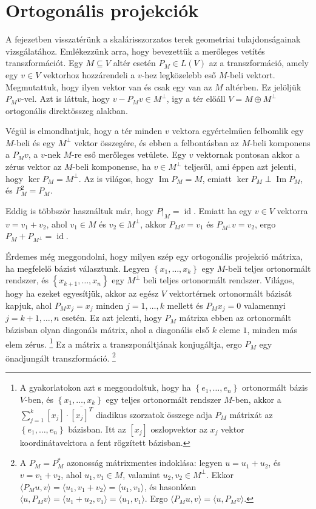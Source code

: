 \documentclass[9pt, a4paper, showtrims]{memoir}
\theoremstyle{plain}
\theoremstyle{remark}
\theoremstyle{definition}
\DeclareMathOperator{\id}{id}
\DeclareMathOperator{\im}{Im}
\newcommand{\ip}[2]{\langle#1,#2\rangle}
\begin{document}
\chapter{Ortogonális projekciók}
A fejezetben visszatérünk a skalárisszorzatos terek geometriai tulajdonságainak vizsgálatához.
Emlékezzünk arra, hogy bevezettük a merőleges vetítés transzformációt.
Egy $M\subseteq V$ altér esetén $P_M\in L\left( V \right)$ az a transzformáció, amely egy $v\in V$ vektorhoz hozzárendeli a $v$-hez legközelebb eső $M$-beli vektort.
Megmutattuk, hogy ilyen vektor van és csak egy van az $M$ altérben.
Ez jelöljük $P_Mv$-vel.
Azt is láttuk, hogy $v-P_Mv\in M^\perp$, igy a tér előáll 
$V=M\oplus M^\perp$ ortogonális direktösszeg alakban.

Végül is elmondhatjuk, hogy a tér minden $v$ vektora egyértelműen felbomlik egy $M$-beli és egy $M^\perp$ vektor összegére,
és ebben a felbontásban az $M$-beli komponens a $P_Mv$, a $v$-nek
$M$-re eső merőleges vetülete.
Egy $v$ vektornak pontosan akkor a zérus vektor az $M$-beli komponense, ha $v\in M^\perp$ teljesül, 
ami éppen azt jelenti, hogy $\ker P_M=M^\perp$.
Az is világos, hogy $\im P_M=M$, 
emiatt $\ker P_M\perp\im P_M$, és $P_M^2=P_M$.

Eddig is többször használtuk már, hogy $P|_M=\id$.
Emiatt ha egy $v\in V$ vektorra $v=v_1+v_2$, ahol $v_1\in M$ és $v_2\in M^\perp$, akkor $P_Mv=v_1$ és $P_{M^\perp}v=v_2$, ergo $P_M+P_{M^\perp}=\id$.

Érdemes még meggondolni, hogy milyen szép egy ortogonális projekció mátrixa, ha megfelelő bázist választunk.
Legyen $\left\{ x_1,\ldots,x_k \right\}$ egy $M$-beli teljes ortonormált rendszer, és $\left\{ x_{k+1},\ldots,x_{n} \right\}$ egy $M^\perp$ beli teljes ortonormált rendszer.
Világos, hogy ha ezeket egyesítjük, akkor az egész $V$ vektortérnek ortonormált bázisát kapjuk, ahol $P_Mx_j=x_j$ minden $j=1,\ldots,k$ mellett és $P_{M}x_j=0$ valamennyi $j=k+1,\ldots,n$ esetén.
Ez azt jelenti, hogy $P_M$ mátrixa ebben az ortonormált bázisban olyan diagonáls mátrix, ahol a diagonális első $k$ eleme $1$, minden más elem zérus.
\footnote{A gyakorlatokon azt s meggondoltuk, hogy ha $\left\{ e_1,\ldots,e_n \right\}$ ortonormált bázis $V$-ben, és $\left\{ x_1,\ldots,x_k \right\}$ egy teljes ortonormált rendszer $M$-ben,
akkor a $\sum_{j=1}^k[x_j]\cdot\overline{[x_j]^T}$ diadikus szorzatok összege adja $P_M$ mátrixát az $\left\{ e_1,\ldots,e_n \right\}$ bázisban. 
Itt az $[x_j]$ oszlopvektor az $x_j$ vektor koordinátavektora a fent rögzített bázisban.}
Ez a mátrix a transzponáltjának konjugáltja, ergo $P_M$ egy önadjungált transzformáció.
\footnote{
    A $P_M=P_M^\ast$ azonosság mátrixmentes indoklása: 
    legyen $u=u_1+u_2$, és $v=v_1+v_2$,
    ahol $u_1,v_1\in M$, valamint $u_2,v_2\in M^\perp$.
    Ekkor 
    $
    \ip{P_Mu}{v}=
    \ip{u_1}{v_1+v_2}
    =
    \ip{u_1}{v_1}
    $,
    és hasonlóan
    $
    \ip{u}{P_Mv}
    =
    \ip{u_1+u_2}{v_1}
    =
    \ip{u_1}{v_1}
    $.
    Ergo 
    $
    \ip{P_Mu}{v}
    =
    \ip{u}{P_Mv}.
    $
}
\end{document}
